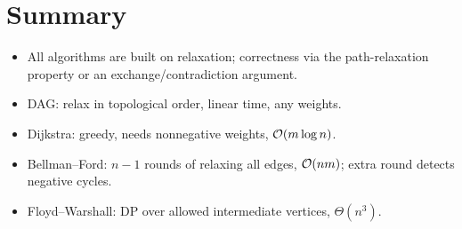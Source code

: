 \section*{Summary}
\begin{itemize}
  \item All algorithms are built on relaxation; correctness via the path-relaxation property or an exchange/contradiction argument.
  \item DAG: relax in topological order, linear time, any weights.
  \item Dijkstra: greedy, needs nonnegative weights, $\mathcal{O}(m\log n)$.
  \item Bellman--Ford: $n-1$ rounds of relaxing all edges, $\mathcal{O}(nm)$; extra round detects negative cycles.
  \item Floyd--Warshall: DP over allowed intermediate vertices, $\Theta(n^3)$.
\end{itemize}
